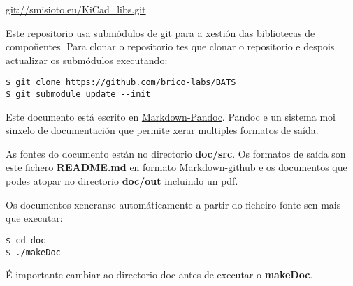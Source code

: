 \url{git://smisioto.eu/KiCad_libs.git}


Este repositorio usa submódulos de git para a xestión das bibliotecas de
compoñentes. Para clonar o repositorio tes que clonar o repositorio e
despois actualizar os submódulos executando:

\begin{verbatim}
$ git clone https://github.com/brico-labs/BATS
$ git submodule update --init
\end{verbatim}

Este documento está escrito en
\href{http://pandoc.org/README.html}{Markdown-Pandoc}. Pandoc e un
sistema moi sinxelo de documentación que permite xerar multiples
formatos de saída.

As fontes do documento están no directorio \textbf{doc/src}. Os formatos
de saída son este fichero \textbf{README.md} en formato Markdown-github
e os documentos que podes atopar no directorio \textbf{doc/out}
incluindo un pdf.

Os documentos xeneranse automáticamente a partir do ficheiro fonte sen
mais que executar:

\begin{verbatim}
$ cd doc
$ ./makeDoc
\end{verbatim}

É importante cambiar ao directorio doc antes de executar o
\textbf{makeDoc}.
